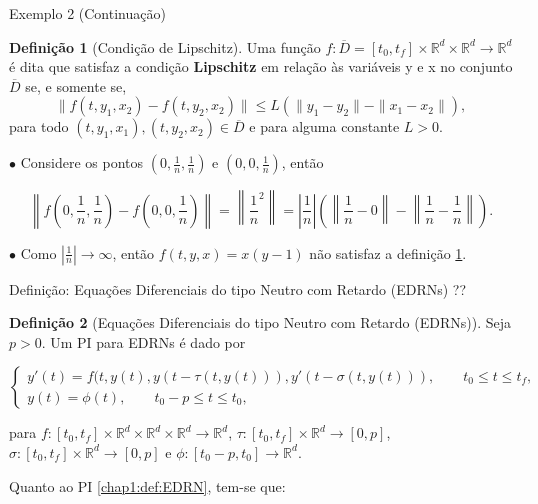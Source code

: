 \documentclass{beamer}
\newcommand{\R}{\mathbb{R}}
\theoremstyle{plain}
\theoremstyle{definition}
\newtheorem{defi}{Definição}
\begin{document}
\begin{frame}{Exemplo 2 (Continuação)}

        \begin{defi}[Condição de Lipschitz]
            \label{def:EDR:Lips}
            Uma função $f: \overline{D} = [t_0, t_f] \times \R^d \times \R^d \to \R^d $ é dita que satisfaz a condição \textbf{Lipschitz} em relação às variáveis y e x no conjunto $\overline{D}$ se, e somente se,
            \begin{equation}
                \| f(t, y_1, x_2) - f(t, y_2, x_2) \| \leq L (\| y_1 - y_2 \| - \|x_1 - x_2\|), 
                \label{chap1:def:eq:EDR_Lips}
            \end{equation}
            para todo $(t, y_1, x_1), (t, y_2, x_2) \in \overline{D}$ e para alguma constante $L>0$.
        \end{defi}


        $\bullet$ Considere os pontos $(0, \frac{1}{n}, \frac{1}{n})$ e $(0, 0, \frac{1}{n})$, então

        \noindent
        \[
            \left\| f\left(0, \frac{1}{n}, \frac{1}{n}\right) - f\left(0, 0, \frac{1}{n}\right) \right\| =  \left\|\frac{1}{n}^2 \right\| =  \left|\frac{1}{n}\right|\left( \left\|\frac{1}{n} - 0\right\| - \left\|\frac{1}{n} - \frac{1}{n} \right\| \right).
        \]

        $\bullet$ Como $|\frac{1}{n}| \to \infty$, então $f(t, y, x) = x(y-1)$ não satisfaz a definição \ref{def:EDR:Lips}.
\end{frame}


\begin{frame}{Definição: Equações Diferenciais do tipo Neutro com Retardo (EDRNs) ??}
     
    \begin{defi}[Equações Diferenciais do tipo Neutro com Retardo (EDRNs)]
        Seja $p>0$. Um PI para EDRNs é dado por

        \footnotesize
        \begin{equation}
            \begin{cases}
                y'(t) = f(t, y(t), y(t - \tau(t, y(t))), y'(t - \sigma(t, y(t))), \qquad t_0 \leq t \leq t_f , \\
                y(t) = \phi(t), \qquad t_0 - p \leq t \leq t_0,
            \end{cases}
            \label{chap1:def:EDRN}
        \end{equation}


    \normalsize
para $f:[t_0, t_f] \times \R^d \times \R^d \times \R^d \to \R^d$, {\color{red}  $\tau: [t_0, t_f] \times \R^d \to [0, p]$}, $\sigma: [t_0, t_f] \times \R^d \to [0, p]$ e $\phi:[t_0 - p, t_0] \to \R^d $. 

    \end{defi}

Quanto ao PI \eqref{chap1:def:EDRN}, tem-se que:
        

\end{frame}
\end{document}
